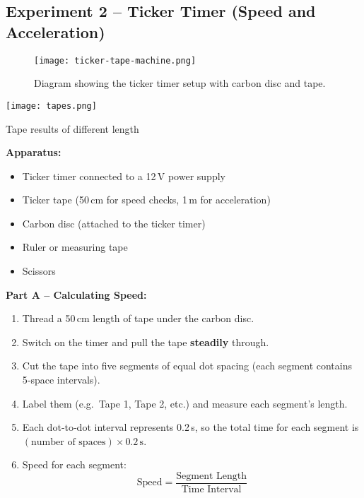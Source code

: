 \documentclass{tufte-handout}
\begin{document}
\vspace{1em}
\subsection{Experiment 2 -- Ticker Timer (Speed and Acceleration)}

\begin{figure}[ht]
\centering
\texttt{[image: ticker-tape-machine.png]}
\caption{Diagram showing the ticker timer setup with carbon disc and tape.}
\label{fig:tickertimersetup}
\end{figure}

\begin{marginfigure}
\texttt{[image: tapes.png]}
\caption{Tape results of different length}
\end{marginfigure}

\noindent\textbf{Apparatus:}
\begin{itemize}
  \item Ticker timer connected to a 12\,V power supply
  \item Ticker tape (50\,cm for speed checks, 1\,m for acceleration)
  \item Carbon disc (attached to the ticker timer)
  \item Ruler or measuring tape
  \item Scissors
\end{itemize}

\noindent\textbf{Part A -- Calculating Speed:}
\begin{enumerate}
  \item Thread a 50\,cm length of tape under the carbon disc.
  \item Switch on the timer and pull the tape \textbf{steadily} through.
  \item Cut the tape into five segments of equal dot spacing (each segment contains 5‐space intervals).
  \item Label them (e.g.\ Tape 1, Tape 2, etc.) and measure each segment’s length.
  \item Each dot‐to‐dot interval represents 0.2\,s, so the total time for each segment is $(\text{number of spaces}) \times 0.2\,\text{s}$.
  \item Speed for each segment:
  \[
    \text{Speed} = \frac{\text{Segment Length}}{\text{Time Interval}}
  \]
\end{enumerate}
\end{document}
